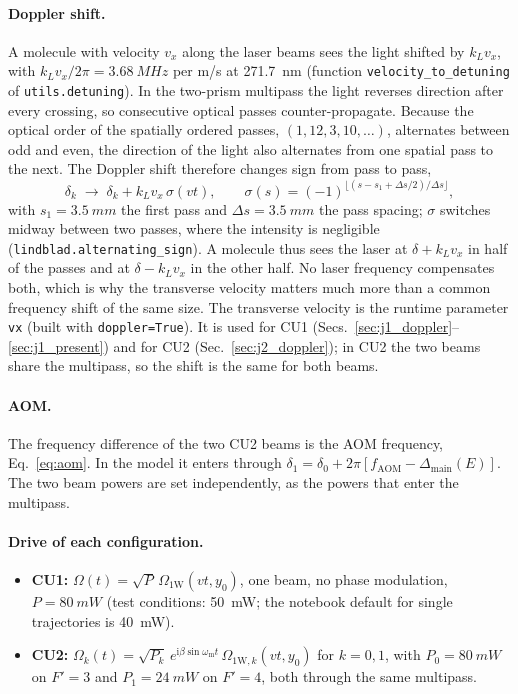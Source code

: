 \documentclass[11pt,a4paper,oneside]{report}
\newcommand{\code}[1]{\texttt{#1}}
\newcommand{\wmod}{\omega_{\mathrm{m}}}
\newcommand{\fAOM}{f_{\mathrm{AOM}}}
\newcommand{\Dmain}{\Delta_{\mathrm{main}}}
\begin{document}
\paragraph{Doppler shift.}
\label{sec:doppler}
A molecule with velocity $v_x$ along the laser beams sees the light shifted by
$k_Lv_x$, with $k_Lv_x/2\pi=\SI{3.68}{MHz}$ per m/s at \SI{271.7}{nm} (function
\code{velocity\_to\_detuning} of \code{utils.detuning}). In the two-prism multipass the light reverses
direction after every crossing, so consecutive optical passes counter-propagate. Because the
optical order of the spatially ordered passes, $(1,12,3,10,\ldots)$, alternates between odd and
even, the direction of the light also alternates from one spatial pass to the next. The
Doppler shift therefore changes sign from pass to pass,
\begin{equation}
  \delta_k\;\to\;\delta_k+k_Lv_x\,\sigma(vt),\qquad
  \sigma(s)=(-1)^{\lfloor (s-s_1+\Delta s/2)/\Delta s\rfloor},
  \label{eq:doppler}
\end{equation}
with $s_1=\SI{3.5}{mm}$ the first pass and $\Delta s=\SI{3.5}{mm}$ the pass spacing; $\sigma$
switches midway between two passes, where the intensity is negligible
(\code{lindblad.alternating\_sign}). A molecule thus sees the laser at $\delta+k_Lv_x$ in
half of the passes and at $\delta-k_Lv_x$ in the other half. No laser frequency compensates
both, which is why the transverse velocity matters much more than a common frequency shift of
the same size. The transverse velocity is the runtime parameter \code{vx} (built with
\code{doppler=True}). It is used for CU1 (Secs.~\ref{sec:j1_doppler}--\ref{sec:j1_present})
and for CU2 (Sec.~\ref{sec:j2_doppler}); in CU2 the two beams share the multipass, so the
shift is the same for both beams.

\paragraph{AOM.} The frequency difference of the two CU2 beams is the AOM frequency,
Eq.~\eqref{eq:aom}. In the model it enters through $\delta_1=\delta_0+2\pi[\fAOM-\Dmain(E)]$.
The two beam powers are set independently, as the powers that enter the multipass.

\paragraph{Drive of each configuration.}
\begin{itemize}
  \item \textbf{CU1:} $\Omega(t)=\sqrt{P}\,\Omega_{1\mathrm W}(vt,y_0)$, one beam, no phase
        modulation, $P=\SI{80}{mW}$ (test conditions: \SI{50}{mW}; the notebook default for single
        trajectories is \SI{40}{mW}).
  \item \textbf{CU2:}
        $\Omega_k(t)=\sqrt{P_k}\,e^{\mathrm i\beta\sin\wmod t}\,\Omega_{1\mathrm W,k}(vt,y_0)$
        for $k=0,1$, with $P_0=\SI{80}{mW}$ on $F'=3$ and $P_1=\SI{24}{mW}$ on $F'=4$, both
        through the same multipass.
\end{itemize}
\end{document}
